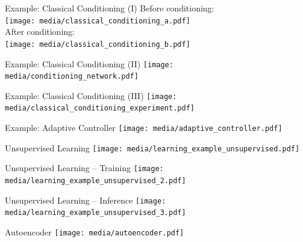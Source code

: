 \documentclass[handout,aspectratio=169]{beamer}
\begin{document}
	\begin{frame}{Example: Classical Conditioning (I)}
		\centering
		Before conditioning:\\[0.125cm]
		\texttt{[image: media/classical\_conditioning\_a.pdf]}\\[0.5cm]
		After conditioning:\\[0.125cm]
		\texttt{[image: media/classical\_conditioning\_b.pdf]}\\[0.5cm]
	\end{frame}

	\begin{frame}{Example: Classical Conditioning (II)}
		\centering
		\vspace{0.25cm}
		\texttt{[image: media/conditioning\_network.pdf]}
	\end{frame}

	\begin{frame}{Example: Classical Conditioning (III)}
		\centering
		\texttt{[image: media/classical\_conditioning\_experiment.pdf]}
	\end{frame}

	\begin{frame}{Example: Adaptive Controller}
		\centering
		\texttt{[image: media/adaptive\_controller.pdf]}
	\end{frame}

	\begin{frame}{Unsupervised Learning}
		\centering
		\texttt{[image: media/learning\_example\_unsupervised.pdf]}
	\end{frame}
	
	\begin{frame}{Unsupervised Learning -- Training}
		\centering
		\texttt{[image: media/learning\_example\_unsupervised\_2.pdf]}
	\end{frame}
	
	\begin{frame}{Unsupervised Learning -- Inference}
		\centering
		\texttt{[image: media/learning\_example\_unsupervised\_3.pdf]}
	\end{frame}

	\begin{frame}{Autoencoder}
		\centering
		\texttt{[image: media/autoencoder.pdf]}
	\end{frame}

\end{document}
